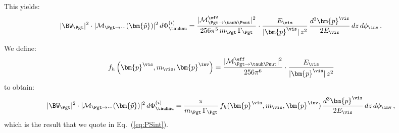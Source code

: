 This yields:
\begin{equation}
\vert \BW_{\Pgt} \vert^{2} \cdot \vert\mathcal{M}_{\Pgt\to\cdots}(\bm{\tilde{p}})\vert^{2} \,
 d\Phi^{(i)}_{\tauhnu} = \frac{\vert\mathcal{M}^{\eff}_{\Pgt \to
  \tauh\Pnut}\vert^{2}}{256\pi^{5}\, m_{\Pgt} \, \Gamma_{\Pgt}} \cdot 
    \frac{E_{\vis}}{\vert\bm{p}^{\vis}\vert \, z^{2}} \, 
    \frac{d^{3}\bm{p}^{\vis}}{2 E_{\vis}} \, dz \, d\phi_{\inv} \, .
\label{eq:hadTauDecaysResult}
\end{equation}

We define:
\begin{equation}
f_{h}\left(\bm{p}^{\vis}, m_{\vis}, \bm{p}^{\inv}\right) = 
  \frac{\vert\mathcal{M}^{\eff}_{\Pgt \to
  \tauh\Pnut}\vert^{2}}{256\pi^{6}} \cdot \frac{E_{\vis}}{\vert\bm{p}^{\vis}\vert \, z^{2}} 
\label{eq:hadTauDecays_f}
\end{equation}
to obtain:
\begin{equation}
\vert \BW_{\Pgt} \vert^{2} \cdot \vert\mathcal{M}_{\Pgt\to\cdots}(\bm{\tilde{p}})\vert^{2} \,
 d\Phi^{(i)}_{\tauhnu} = \frac{\pi}{m_{\Pgt} \, \Gamma_{\Pgt}} \,
 f_{h}(\bm{p}^{\vis}, m_{\vis}, \bm{p}^{\inv}) \, \frac{d^{3}\bm{p}^{\vis}}{2 E_{\vis}} \, dz \, d\phi_{\inv}
 \, ,
\end{equation}
which is the result that we quote in Eq.~(\ref{eq:PSint}).
